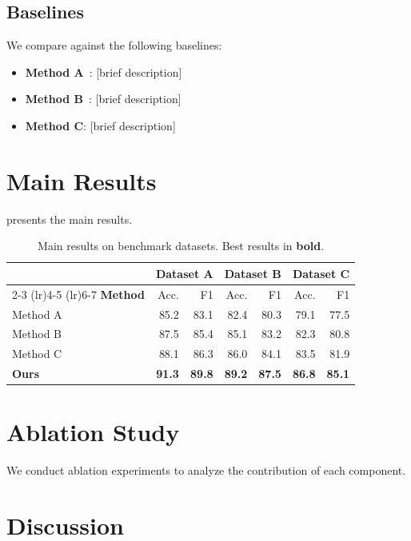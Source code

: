 \documentclass[12pt,a4paper,oneside]{book}
\theoremstyle{plain}
\theoremstyle{definition}
\theoremstyle{remark}
\begin{document}
\subsection{Baselines}

We compare against the following baselines:
\begin{itemize}[itemsep=0.3em]
    \item \textbf{Method A}~\citep{lecun1998gradient}: [brief description]
    \item \textbf{Method B}~\citep{devlin2018bert}: [brief description]
    \item \textbf{Method C}: [brief description]
\end{itemize}

\section{Main Results}

 presents the main results.

\begin{table}[tbp]
\centering
\caption{Main results on benchmark datasets. Best results in \textbf{bold}.}
\label{tab:results}
\begin{tabular}{@{}lrrrrrr@{}}
\toprule
 & \multicolumn{2}{c}{\textbf{Dataset A}} & \multicolumn{2}{c}{\textbf{Dataset B}} & \multicolumn{2}{c}{\textbf{Dataset C}} \\
\cmidrule(lr){2-3} \cmidrule(lr){4-5} \cmidrule(lr){6-7}
\textbf{Method} & Acc. & F1 & Acc. & F1 & Acc. & F1 \\
\midrule
Method A      & 85.2 & 83.1 & 82.4 & 80.3 & 79.1 & 77.5 \\
Method B      & 87.5 & 85.4 & 85.1 & 83.2 & 82.3 & 80.8 \\
Method C      & 88.1 & 86.3 & 86.0 & 84.1 & 83.5 & 81.9 \\
\textbf{Ours} & \textbf{91.3} & \textbf{89.8} & \textbf{89.2} & \textbf{87.5} & \textbf{86.8} & \textbf{85.1} \\
\bottomrule
\end{tabular}
\end{table}

\section{Ablation Study}

We conduct ablation experiments to analyze the contribution of each component.

\section{Discussion}
\end{document}
